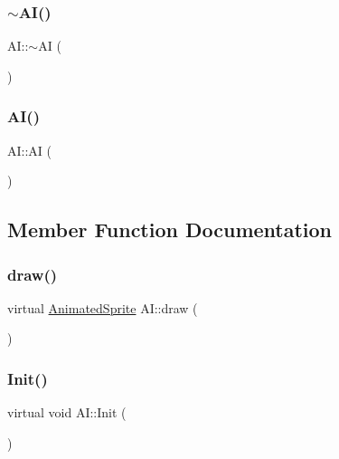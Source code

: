 \subsubsection{\texorpdfstring{$\sim$\+A\+I()}{~AI()}}
{\footnotesize\ttfamily A\+I\+::$\sim$\+AI (\begin{DoxyParamCaption}{ }\end{DoxyParamCaption})}

\mbox{\label{class_a_i_a64ec60281e9eb8496f16525615db54b7}} 
\subsubsection{\texorpdfstring{A\+I()}{AI()}}
{\footnotesize\ttfamily A\+I\+::\+AI (\begin{DoxyParamCaption}{ }\end{DoxyParamCaption})}



\subsection{Member Function Documentation}
\mbox{\label{class_a_i_ae6dd19104a86c350d521ccd5d3c928c5}} 
\subsubsection{\texorpdfstring{draw()}{draw()}}
{\footnotesize\ttfamily virtual \hyperlink{class_animated_sprite}{Animated\+Sprite} A\+I\+::draw (\begin{DoxyParamCaption}{ }\end{DoxyParamCaption})\hspace{0.3cm}{\ttfamily [pure virtual]}}

\mbox{\label{class_a_i_ac80497af3767e78d7167317f9f7708d3}} 
\subsubsection{\texorpdfstring{Init()}{Init()}}
{\footnotesize\ttfamily virtual void A\+I\+::\+Init (\begin{DoxyParamCaption}{ }\end{DoxyParamCaption})\hspace{0.3cm}{\ttfamily [pure virtual]}}

